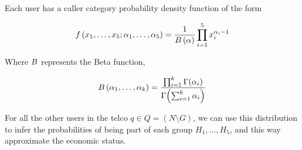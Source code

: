 Each user has a caller category probability density function of the form

\[
f \left( x_1, \ldots, x_5; \alpha_1, \ldots, \alpha_5 \right) = \frac{1}{B \left( \alpha \right)} \prod^5_{i = 1} x_i^{\alpha_i - 1}
\]

Where $ B $ represents the Beta function,

\[
B \left( \alpha_1, \ldots, \alpha_k \right) = \frac{\prod^k_{i = 1} \Gamma \! \left( \alpha_i \right)}{\Gamma \! \left( \sum^k_{i = 1} \alpha_i \right) }
\]

For all the other users in the telco $ q \in Q = (N \setminus G) $, we can use this distribution to infer the probabilities of being part of each group $ H_1, \ldots, H_5 $, and this way approximate the economic status.
